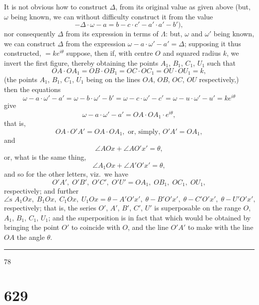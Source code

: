 \documentclass[11pt,a4paper]{book}
\begin{document}
\newpage

\noindent
It is not obvious how to construct $\Delta$, from its original value as given above (but, $\omega$ being known, we can without difficulty construct it from the value
\[
-\Delta \cdot \omega - a = b - c \cdot c' - a' \cdot a' - b'),
\]
nor consequently $\Delta$ from its expression in terms of $\Lambda$: but, $\omega$ and $\omega'$ being known, we can construct $\Delta$ from the expression $\omega - a \cdot \omega' - a' = \Delta$; supposing it thus constructed, $= ke^{i\theta}$ suppose, then if, with centre $O$ and squared radius $k$, we invert the first figure, thereby obtaining the points $A_1$, $B_1$, $C_1$, $U_1$ such that
\[
OA \cdot OA_1 = OB \cdot OB_1 = OC \cdot OC_1 = OU \cdot OU_1 = k,
\]
(the points $A_1$, $B_1$, $C_1$, $U_1$ being on the lines $OA$, $OB$, $OC$, $OU$ respectively,) then the equations
\[
\omega - a \cdot \omega' - a' = \omega - b \cdot \omega' - b' = \omega - c \cdot \omega' - c' = \omega - u \cdot \omega' - u' = ke^{i\theta}
\]
give
\[
\omega - a \cdot \omega' - a' = OA \cdot OA_1 \cdot e^{i\theta},
\]
that is,
\[
OA \cdot O'A' = OA \cdot OA_1, \text{ or, simply, } O'A' = OA_1,
\]
and
\[
\angle AOx + \angle AO'x' = \theta,
\]
or, what is the same thing,
\[
\angle A_1Ox + \angle A'O'x' = \theta,
\]
and so for the other letters, viz.\ we have
\[
O'A',\; O'B',\; O'C',\; O'U' = OA_1,\; OB_1,\; OC_1,\; OU_1,
\]
respectively; and further
\[
\angle\text{s } A_1Ox,\; B_1Ox,\; C_1Ox,\; U_1Ox = \theta - A'O'x',\; \theta - B'O'x',\; \theta - C'O'x',\; \theta - U'O'x',
\]
respectively; that is, the series $O'$, $A'$, $B'$, $C'$, $U'$ is superposable on the range $O$, $A_1$, $B_1$, $C_1$, $U_1$; and the superposition is in fact that which would be obtained by bringing the point $O'$ to coincide with $O$, and the line $O'A'$ to make with the line $OA$ the angle $\theta$.

\noindent\rule{2em}{0.4pt}\hfill 78

\newpage

\section*{629}
\end{document}
